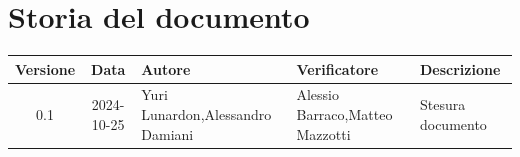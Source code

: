 \section{Storia del documento}
\begin{center}
    \begin{tabular}{ c c p{} p{} p{3cm} }
        \rowcolor{gray!20}\rule{0pt}{0.5cm}\textbf{Versione} & \textbf{Data} & \textbf{Autore} & \textbf{Verificatore} & \textbf{Descrizione} \\[0.7ex]
        \hline
        \rule{0pt}{0.5cm}0.1 & 2024-10-25 & Yuri Lunardon,\newline Alessandro Damiani  & Alessio Barraco,\newline Matteo Mazzotti & Stesura documento\\[0.7ex]
        
    \end{tabular}
\end{center}
